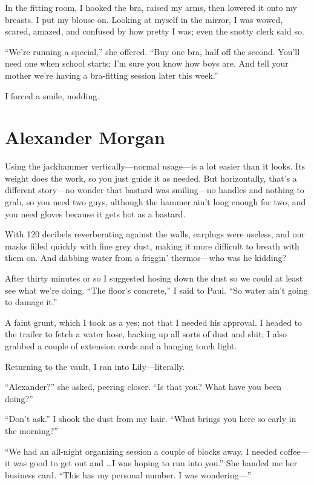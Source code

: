In the fitting room, I hooked the bra, raised my arms, then lowered it
onto my breasts. I put my blouse on. Looking at myself in the mirror, I
was wowed, scared, amazed, and confused by how pretty I was; even the
snotty clerk said so.

``We're running a special,'' she offered. ``Buy one bra, half off the
second. You'll need one when school starts; I'm sure you know how boys
are. And tell your mother we're having a bra-fitting session later this
week.''

I forced a smile, nodding.

\chapter{Alexander Morgan}

\titlemark

Using the jackhammer vertically---normal usage---is a lot easier than it
looks. Its weight does the work, so you just guide it as needed. But
horizontally, that's a different story---no wonder that bastard was
smiling---no handles and nothing to grab, so you need two guys, although
the hammer ain't long enough for two, and you need gloves because it
gets hot as a bastard.

With 120 decibels reverberating against the walls, earplugs were
useless, and our masks filled quickly with fine grey dust, making it
more difficult to breath with them on. And dabbing water from a friggin'
thermos---who was he kidding?

After thirty minutes or so I suggested hosing down the dust so we could
at least see what we're doing. ``The floor's concrete,'' I said to Paul.
``So water ain't going to damage it.''

A faint grunt, which I took as a yes; not that I needed his approval. I
headed to the trailer to fetch a water hose, hacking up all sorts of
dust and shit; I also grabbed a couple of extension cords and a hanging
torch light.

Returning to the vault, I ran into Lily---literally.

``Alexander?'' she asked, peering closer. ``Is that you? What have you
been doing?''

``Don't ask.'' I shook the dust from my hair. ``What brings you here so
early in the morning?''

``We had an all-night organizing session a couple of blocks away. I
needed coffee---it was good to get out and \ldots I was hoping to run
into you.'' She handed me her business card. ``This has my personal
number. I was wondering---''

